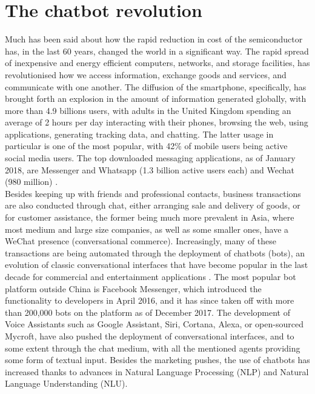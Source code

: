 \section{The chatbot revolution}
Much has been said about how the rapid reduction in cost of the semiconductor has, in the last 60 years, changed the world in a significant way. The rapid spread of inexpensive and energy efficient computers, networks, and storage facilities, has revolutionised how we access information, exchange goods and services, and communicate with one another. The diffusion of the smartphone, specifically, has brought forth an explosion in the amount of information generated globally, with more than 4.9 billions users, with adults in the United Kingdom spending an average of 2 hours per day interacting with their phones, browsing the web, using applications, generating tracking data, and chatting. The latter usage in particular is one of the most popular, with 42\% of mobile users \cite{mobilesocial} being active social media users. The top downloaded messaging applications, as of January 2018, are Messenger and Whatsapp (1.3 billion active users each) and Wechat (980 million) \cite{mobilestatista}. \\
Besides keeping up with friends and professional contacts, business transactions are also conducted through chat, either arranging sale and delivery of goods, or for customer assistance, the former being much more prevalent in Asia, where most medium and large size companies, as well as some smaller ones, have a WeChat presence (conversational commerce). Increasingly, many of these transactions are being automated through the deployment of chatbots (bots), an evolution of classic conversational interfaces that have become popular in the last decade for commercial and entertainment applications \cite{Dale2016}. The most popular bot platform outside China is Facebook Messenger, which introduced the functionality to developers in April 2016\cite{Messenger2016}, and it has since taken off with more than 200,000 bots on the platform as of December 2017\cite{Messenger2017}. The development of Voice Assistants such as Google Assistant, Siri, Cortana, Alexa, or open-sourced Mycroft, have also pushed the deployment of conversational interfaces, and to some extent through the chat medium, with all the mentioned agents providing some form of textual input.
Besides the marketing pushes, the use of chatbots has increased thanks to advances in Natural Language Processing (NLP) and Natural Language Understanding (NLU). \\
